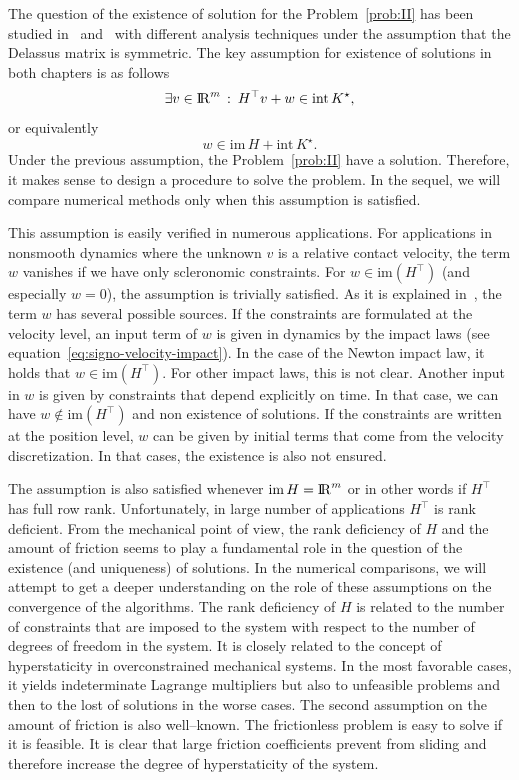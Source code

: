 {The question of the existence of solution for the Problem~\ref{prob:II} has been studied in~\cite{Klarbring.Pang1998} and~\cite{Acary.ea_ZAMM2011} with different analysis techniques under the assumption that the Delassus matrix is symmetric.
The key assumption for existence of solutions in both chapters is as follows
\begin{equation}\label{ass}
   \exists v\in \RR^m \,:\: H^\top v + w \in \mathrm{int}\, K^\star,
\end{equation}
or equivalently
\begin{equation}\label{asseq}
  w\in\mathrm{im}\, H + \mathrm{int}\, K^\star.
\end{equation}
Under the previous assumption, the Problem~\ref{prob:II} have a solution.
Therefore, it makes sense to design a procedure to solve the problem. In the sequel, we will compare numerical methods only when this assumption is satisfied.

This assumption is easily verified in numerous applications. For applications in nonsmooth dynamics where the unknown $v$ is a relative contact velocity, the term $w$ vanishes if we have only scleronomic constraints. For $w \in \mathrm{im}(H^\top)$ (and especially $w=0$), the assumption is trivially satisfied. As it is explained in~\cite{Acary.Cadoux2013}, the term $w$ has several possible sources. If the constraints are formulated at the velocity level, an input term of $w$ is given in dynamics by the impact laws (see equation~\eqref{eq:signo-velocity-impact}). In the case of the Newton impact law, it holds that $w \in \mathrm{im}(H^\top)$.   For other impact laws, this is not clear. Another input in $w$ is given by constraints that depend explicitly on time. In that case, we can have $w \not\in \mathrm{im}(H^\top)$ and non existence of solutions. If the constraints are written at the position level, $w$ can be given by initial  terms that come from the  velocity discretization. In that cases, the existence is also not ensured.

The assumption is also satisfied {whenever} $\mathrm{im}\, H = \mathrm{I\!R}^m$ or in other words if $H^\top$ has full row rank. Unfortunately, in large number of applications $H^\top$ is rank deficient. 
From the mechanical point of view, the rank deficiency of $H$ and the amount of friction seems to play a fundamental role in the question of the existence (and uniqueness) of solutions. In the numerical comparisons, we will attempt to get a deeper understanding on the role of these assumptions on the convergence of the algorithms. The rank deficiency  of $H$ is related to the number of constraints that are imposed to the system with respect to the number of degrees of freedom in the system. It is closely related to the concept of hyperstaticity in overconstrained mechanical  systems. In the most favorable cases, it yields  indeterminate Lagrange multipliers but also to unfeasible problems and then to the lost of solutions in the worse cases. The second assumption on the amount of friction is also well--known. The frictionless problem is  easy to solve if it is  feasible. It is clear that large friction coefficients prevent from sliding and therefore increase the degree of hyperstaticity of the system. 

}
